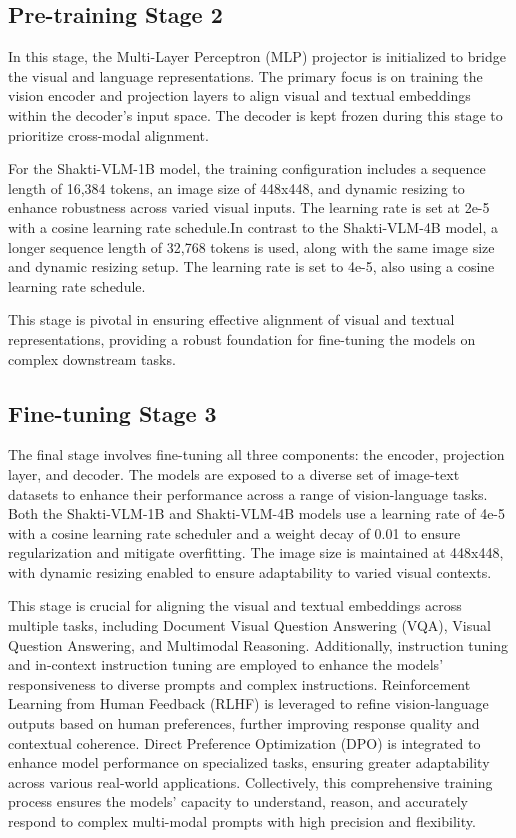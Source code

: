 \documentclass{article}
\begin{document}
\subsection{Pre-training Stage 2 }
 In this stage, the Multi-Layer Perceptron (MLP)\cite{7238334mlp} projector is initialized to bridge the visual and language representations. The primary focus is on training the vision encoder and projection layers to align visual and textual embeddings within the decoder’s input space. The decoder is kept frozen during this stage to prioritize cross-modal alignment. 

For the Shakti-VLM-1B model, the training configuration includes a sequence length of 16,384 tokens, an image size of 448x448, and dynamic resizing to enhance robustness across varied visual inputs. The learning rate is set at 2e-5 with a cosine learning rate schedule.In contrast to the Shakti-VLM-4B model, a longer sequence length of 32,768 tokens is used, along with the same image size and dynamic resizing setup. The learning rate is set to 4e-5, also using a cosine learning rate schedule. 

This stage is pivotal in ensuring effective alignment of visual and textual representations, providing a robust foundation for fine-tuning the models on complex downstream tasks. 

\subsection{Fine-tuning Stage 3 }
 The final stage involves fine-tuning all three components: the encoder, projection layer, and decoder. The models are exposed to a diverse set of image-text datasets to enhance their performance across a range of vision-language tasks. Both the Shakti-VLM-1B and Shakti-VLM-4B models use a learning rate of 4e-5 with a cosine learning rate scheduler and a weight decay of 0.01 to ensure regularization and mitigate overfitting. The image size is maintained at 448x448, with dynamic resizing enabled to ensure adaptability to varied visual contexts. 

This stage is crucial for aligning the visual and textual embeddings across multiple tasks, including Document Visual Question Answering (VQA), Visual Question Answering, and Multimodal Reasoning. Additionally, instruction tuning and in-context instruction tuning are employed to enhance the models' responsiveness to diverse prompts and complex instructions. Reinforcement Learning from Human Feedback (RLHF)\cite{rlhf} is leveraged to refine vision-language outputs based on human preferences, further improving response quality and contextual coherence. Direct Preference Optimization (DPO)\cite{dpo} is integrated to enhance model performance on specialized tasks, ensuring greater adaptability across various real-world applications. Collectively, this comprehensive training process ensures the models’ capacity to understand, reason, and accurately respond to complex multi-modal prompts with high precision and flexibility. 
\end{document}

